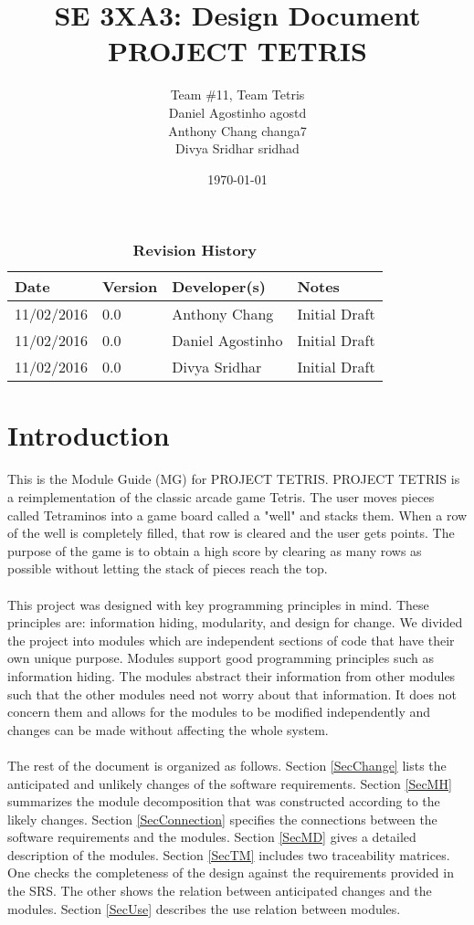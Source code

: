\documentclass[12pt, titlepage]{article}
\title{SE 3XA3: Design Document\\PROJECT TETRIS}
\author{Team \#11, Team Tetris
		\\ Daniel Agostinho agostd
		\\ Anthony Chang changa7
		\\ Divya Sridhar sridhad
}
\date{\today}
\begin{document}
\maketitle
{}
\tableofcontents
\listoftables
\listoffigures
\begin{table}[bp]
\caption{\bf Revision History}
\begin{tabularx}{\textwidth}{p{3cm}p{2cm}p{4cm}X}
\toprule {\bf Date} & {\bf Version} & {\bf Developer(s)} & {\bf Notes}\\
\midrule
11/02/2016 & 0.0 & Anthony Chang & Initial Draft\\
11/02/2016 & 0.0 &  Daniel Agostinho & Initial Draft\\
11/02/2016 & 0.0 & Divya Sridhar & Initial Draft\\
\bottomrule
\end{tabularx}
\end{table}
\newpage
{}

\section{Introduction}
	This is the Module Guide (MG) for PROJECT TETRIS. PROJECT TETRIS is a reimplementation of the classic arcade game Tetris. The user moves pieces called Tetraminos into a game board called a "well" and stacks them. When a row of the well is completely filled, that row is cleared and the user gets points. The purpose of the game is to obtain a high score by clearing as many rows as possible without letting the stack of pieces reach the top. 
\paragraph{}
	This project was designed with key programming principles in mind. These principles are: information hiding, modularity, and design for change. We divided the project into modules which are independent sections of code that have their own unique purpose. Modules support good programming principles such as information hiding. The modules abstract their information from other modules such that the other modules need not worry about that information. It does not concern them and allows for the modules to be modified independently and changes can be made without affecting the whole system.
\paragraph{}
	The rest of the document is organized as follows. Section
\ref{SecChange} lists the anticipated and unlikely changes of the software
requirements. Section \ref{SecMH} summarizes the module decomposition that
was constructed according to the likely changes. Section \ref{SecConnection}
specifies the connections between the software requirements and the
modules. Section \ref{SecMD} gives a detailed description of the
modules. Section \ref{SecTM} includes two traceability matrices. One checks
the completeness of the design against the requirements provided in the SRS. The
other shows the relation between anticipated changes and the modules. Section
\ref{SecUse} describes the use relation between modules.
\end{document}
